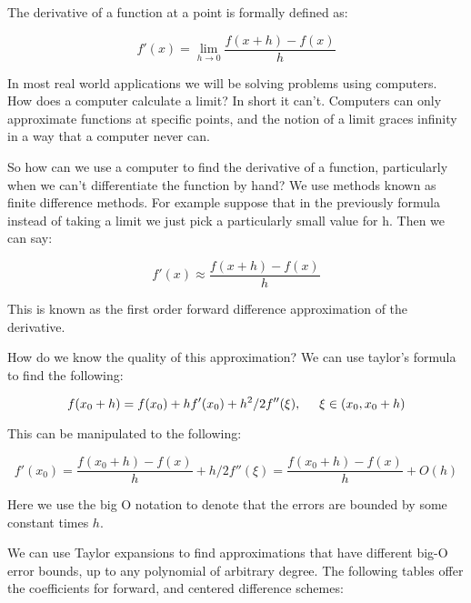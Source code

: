 

The derivative of a function at a point is formally defined as:

\[
f'(x) = \lim_{h\rightarrow 0} \frac{f(x + h)-f(x)}{h}
\]

In most real world applications we will be solving problems using computers. How does a computer calculate a limit? In short it can't. Computers can only approximate functions at specific points, and the notion of a limit graces infinity in a way that a computer never can.

So how can we use a computer to find the derivative of a function, particularly when we can't differentiate the function by hand? We use methods known as finite difference methods. For example suppose that in the previously formula instead of taking a limit we just pick a particularly small value for h. Then we can say:

\[
f'(x) \approx \frac{f(x + h)-f(x)}{h}
\]

This is known as the first order forward difference approximation of the derivative.

How do we know the quality of this approximation? We can use taylor's formula to find the following:

\[
f(x_0 + h) = f(x_0) + hf'(x_0) + h^2/2 f''(\xi),\hspace{5mm} \xi \in (x_0,x_0 + h)
\]

This can be manipulated to the following:

\[
f'(x_0) = \frac{f(x_0 + h) - f(x)}{h} + h/2 f''(\xi) = \frac{f(x_0 + h) - f(x)}{h} + O(h)
\]

Here we use the big O notation to denote that the errors are bounded by some constant times $h$.

We can use Taylor expansions to find approximations that have different big-O error bounds, up to any polynomial of arbitrary degree. The following tables offer the coefficients for forward, and centered difference schemes:


